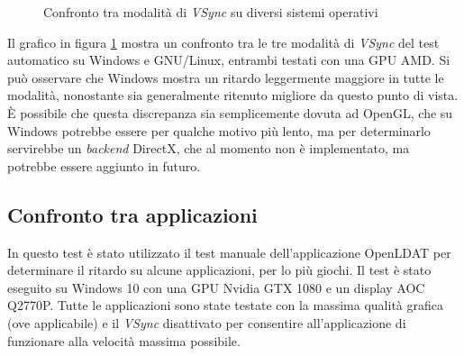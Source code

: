 \begin{figure}[h!]
	\centering
	\dataset
	\caption{Confronto tra modalità di \textit{VSync} su diversi sistemi operativi}
	\label{fig:inputlag_vsyncmodes}
\end{figure}

Il grafico in figura \ref{fig:inputlag_vsyncmodes} mostra un confronto tra le tre modalità di \textit{VSync} del test automatico su Windows e GNU/Linux, entrambi testati con una GPU AMD. Si può osservare che Windows mostra un ritardo leggermente maggiore in tutte le modalità, nonostante sia generalmente ritenuto migliore da questo punto di vista. È possibile che questa discrepanza sia semplicemente dovuta ad OpenGL, che su Windows potrebbe essere per qualche motivo più lento, ma per determinarlo servirebbe un \textit{backend} DirectX, che al momento non è implementato, ma potrebbe essere aggiunto in futuro.

\subsection{Confronto tra applicazioni}
In questo test è stato utilizzato il test manuale dell'applicazione OpenLDAT per determinare il ritardo su alcune applicazioni, per lo più giochi. Il test è stato eseguito su Windows 10 con una GPU Nvidia GTX 1080 e un display AOC Q2770P. Tutte le applicazioni sono state testate con la massima qualità grafica (ove applicabile) e il \textit{VSync} disattivato per consentire all'applicazione di funzionare alla velocità massima possibile.

